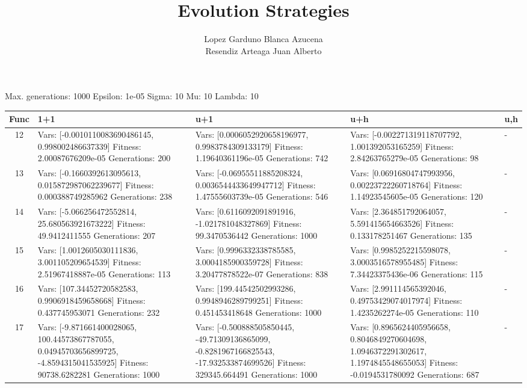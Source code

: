 \documentclass[landscape,11pt]{article}
\begin{document}
\title{Evolution Strategies}
 \author{Lopez Garduno Blanca Azucena\\ Resendiz Arteaga Juan Alberto}
 \maketitle
Max. generations: 1000 Epsilon: 1e-05 Sigma: 10 Mu: 10 Lambda: 10 \\
\begin{tabular}{|c|p{5.4cm}|p{5.4cm}|p{5.4cm}|p{5.4cm}|}
 \hline
 Func & 1+1 & u+1 & u+h & u,h \\ 
 \hline
 12 & Vars: [-0.0010110083690486145, 0.998002486637339] Fitness: 2.00087676209e-05 Generations: 200 & Vars: [0.0006052920658196977, 0.9983784309133179] Fitness: 1.19640361196e-05 Generations: 742 & Vars: [-0.002271319118707792, 1.001392053165259] Fitness: 2.84263765279e-05 Generations: 98 & - \\
 \hline 
 13 & Vars: [-0.1660392613095613, 0.015872987062239677] Fitness: 0.000388749285962 Generations: 238 & Vars: [-0.06955511885208324, 0.0036544433649947712] Fitness: 1.47555603739e-05 Generations: 546 & Vars: [0.06916804747993956, 0.00223722260718764] Fitness: 1.14923545605e-05 Generations: 120 & - \\
 \hline 
 14 & Vars: [-5.066256472552814, 25.680563921673222] Fitness: 49.9412411555 Generations: 207 & Vars: [0.6116092091891916, -1.021781048327869] Fitness: 99.3470536442 Generations: 1000 & Vars: [2.364851792064057, 5.591415654663526] Fitness: 0.133178251467 Generations: 135 & - \\
 \hline 
 15 & Vars: [1.0012605030111836, 3.001105209654539] Fitness: 2.51967418887e-05 Generations: 113 & Vars: [0.9996332338785585, 3.0004185900359728] Fitness: 3.20477878522e-07 Generations: 838 & Vars: [0.9985252215598078, 3.0003516578955485] Fitness: 7.34423375436e-06 Generations: 115 & - \\
 \hline 
 16 & Vars: [107.34452720582583, 0.9906918459658668] Fitness: 0.437745953071 Generations: 232 & Vars: [199.44542502993286, 0.9948946289799251] Fitness: 0.451453418648 Generations: 1000 & Vars: [2.991114565392046, 0.49753429074017974] Fitness: 1.4235262274e-05 Generations: 110 & - \\
 \hline 
 17 & Vars: [-9.871661400028065, 100.44573867787055, 0.04945703656899725, -4.8594315041535925] Fitness: 90738.6282281 Generations: 1000 & Vars: [-0.500888505850445, -49.71309136865099, -0.8281967166825543, -17.932533874699526] Fitness: 329345.664491 Generations: 1000 & Vars: [0.8965624405956658, 0.8046849270604698, 1.0946372291302617, 1.1974845548655053] Fitness: -0.0194531780092 Generations: 687 & - \\

\end{tabular}
\end{document}
